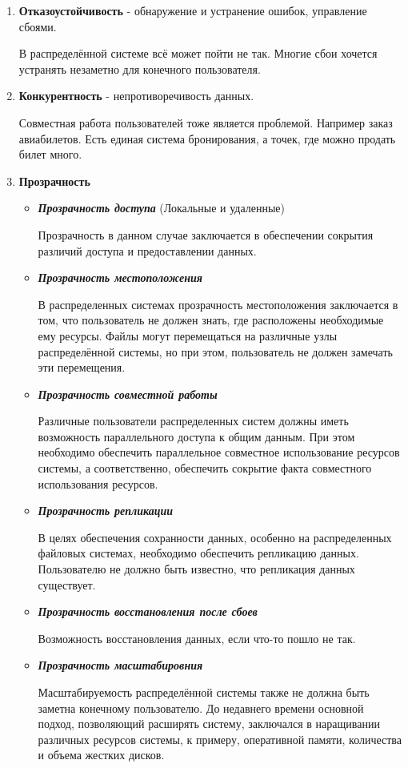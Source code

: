 \begin{enumerate}
\item
\textbf{ Отказоустойчивость} - обнаружение и устранение ошибок, управление сбоями.

В распределённой системе всё может пойти не так.
Многие сбои хочется устранять незаметно для конечного пользователя.

\item
\textbf{ Конкурентность} - непротиворечивость данных.

Совместная работа пользователей тоже является проблемой.
Например заказ авиабилетов. Есть единая система бронирования, а точек, где можно продать билет много.

\item
\textbf{ Прозрачность}

\begin{itemize}
\item
\textit{\textbf{ Прозрачность доступа}} (Локальные и удаленные)

Прозрачность в данном случае заключается в обеспечении сокрытия различий доступа и предоставлении данных.

\item
\textit{ \textbf{Прозрачность местоположения }}

В распределенных системах прозрачность местоположения заключается в том, что пользователь не должен знать, где расположены необходимые ему ресурсы. 
Файлы могут перемещаться на различные узлы распределённой системы, но при этом, пользователь не должен замечать эти перемещения.

\item
\textit{\textbf{ Прозрачность совместной работы}}

Различные пользователи распределенных систем должны иметь возможность параллельного доступа к общим данным. При этом необходимо обеспечить параллельное совместное использование ресурсов системы, а соответственно, обеспечить сокрытие факта совместного использования ресурсов.

\item
\textit{\textbf{ Прозрачность репликации }}

В целях обеспечения сохранности данных, особенно на распределенных файловых системах, необходимо обеспечить репликацию данных. Пользователю не должно быть известно, что репликация данных существует.

\item
\textit{\textbf{ Прозрачность восстановления после сбоев}}

Возможность восстановления данных, если что-то пошло не так.

\item
\textit{\textbf{ Прозрачность масштабировния}}

Масштабируемость распределённой системы также не должна быть заметна конечному пользователю. До недавнего времени основной подход, позволяющий расширять систему, заключался в наращивании различных ресурсов системы, к примеру, оперативной памяти, количества и объема жестких дисков. 
\end{itemize}

\end{enumerate}
